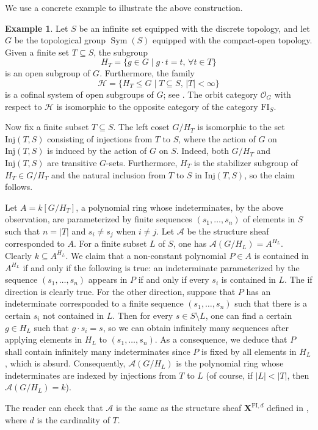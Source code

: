 \documentclass[11pt, reqno]{amsart}
\theoremstyle{plain}
\numberwithin{equation}{section}
\theoremstyle{definition}
\newtheorem{example}[theorem]{Example}
\newcommand{\Inj}{{\mathrm{Inj}}}
\DeclareMathOperator{\Sym}{Sym}
\newcommand{\FI}{{\mathrm{FI}}}
\begin{document}
We use a concrete example to illustrate the above construction.

\begin{example} \label{structure sheaves over FI}
Let $S$ be an infinite set equipped with the discrete topology, and let $G$ be the topological group $\Sym(S)$ equipped with the compact-open topology. Given a finite set $T \subseteq S$, the subgroup
\[
H_T = \{ g \in G \mid g \cdot t = t, \, \forall t \in T \}
\]
is an open subgroup of $G$. Furthermore, the family
\[
\mathcal{H} = \{ H_T \leqslant G \mid T \subseteq S, \, |T| < \infty \}
\]
is a cofinal system of open subgroups of $G$; see \cite[III.20, Theorem 3]{Hu}. The orbit category $\mathcal{O}_G$ with respect to $\mathcal{H}$ is isomorphic to the opposite category of the category $\FI_S$.

Now fix a finite subset $T \subseteq S$. The left coset $G/H_T$ is isomorphic to the set $\Inj(T, S)$ consisting of injections from $T$ to $S$, where the action of $G$ on $\Inj(T, S)$ is induced by the action of $G$ on $S$. Indeed, both $G/H_T$ and $\Inj(T, S)$ are transitive $G$-sets. Furthermore, $H_T$ is the stabilizer subgroup of $H_T \in G/H_T$ and the natural inclusion from $T$ to $S$ in $\Inj(T, S)$, so the claim follows.

Let $A = k[G/H_T]$, a polynomial ring whose indeterminates, by the above observation, are parameterized by finite sequences $(s_1, \ldots, s_n)$ of elements in $S$ such that $n = |T|$ and $s_i \neq s_j$ when $i \neq j$. Let $\mathcal{A}$ be the structure sheaf corresponded to $A$. For a finite subset $L$ of $S$, one has $\mathcal{A}(G/H_L) = A^{H_L}$. Clearly $k \subseteq A^{H_L}$. We claim that a non-constant polynomial $P \in A$ is contained in $A^{H_L}$ if and only if the following is true: an indeterminate parameterized by the sequence $(s_1, \ldots, s_n)$ appears in $P$ if and only if every $s_i$ is contained in $L$. The if direction is clearly true. For the other direction, suppose that $P$ has an indeterminate corresponded to a finite sequence $(s_1, \ldots, s_n)$ such that there is a certain $s_i$ not contained in $L$. Then for every $s \in S \setminus L$, one can find a certain $g \in H_L$ such that $g \cdot s_i = s$, so we can obtain infinitely many sequences after applying elements in $H_L$ to $(s_1, \ldots, s_n)$. As a consequence, we deduce that $P$ shall contain infinitely many indeterminates since $P$ is fixed by all elements in $H_L$, which is absurd. Consequently, $\mathcal{A}(G/H_L)$ is the polynomial ring whose indeterminates are indexed by injections from $T$ to $L$ (of course, if $|L| < |T|$, then $\mathcal{A}(G/H_L) = k$).

The reader can check that $\mathcal{A}$ is the same as the structure sheaf $\mathbf{X}^{\FI, d}$ defined in \cite[Definition 2.17]{NR1}, where $d$ is the cardinality of $T$.
\end{example}
\end{document}

